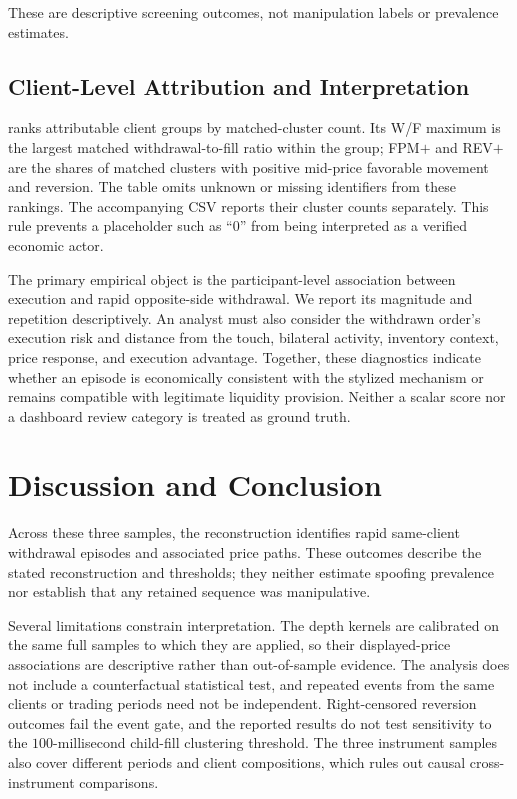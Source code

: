 \documentclass[11pt]{article}
\begin{document}
These are descriptive screening outcomes, not manipulation labels or prevalence estimates.

\subsection{Client-Level Attribution and Interpretation}
\label{subsec:client_level_results}

 ranks attributable client groups by matched-cluster count. Its W/F maximum is the
largest matched withdrawal-to-fill ratio within the group; FPM$+$ and REV$+$ are the shares of matched clusters with
positive mid-price favorable movement and reversion. The table omits unknown or missing identifiers from these rankings.
The accompanying CSV reports their cluster counts separately. This rule prevents a placeholder such as ``0'' from being
interpreted as a verified economic actor.

The primary empirical object is the participant-level association between execution and rapid opposite-side withdrawal.
We report its magnitude and repetition descriptively. An analyst must also consider the withdrawn order's execution risk
and distance from the touch, bilateral activity, inventory context, price response, and execution advantage. Together,
these diagnostics indicate whether an episode is economically consistent with the stylized mechanism or remains compatible
with legitimate liquidity provision. Neither a scalar score nor a dashboard review category is treated as ground truth.

\section{Discussion and Conclusion}
\label{sec:discussion_conclusion}

Across these three samples, the reconstruction identifies rapid same-client withdrawal episodes and associated price paths.
These outcomes describe the stated reconstruction and thresholds; they neither estimate spoofing prevalence nor establish
that any retained sequence was manipulative.

Several limitations constrain interpretation. The depth kernels are calibrated on the same full samples to which they are
applied, so their displayed-price associations are descriptive rather than out-of-sample evidence. The analysis does not
include a counterfactual statistical test, and repeated events from the same clients or trading periods need not be
independent. Right-censored reversion outcomes fail the event gate, and the reported results do not test sensitivity to the
$100$-millisecond child-fill clustering threshold. The three instrument samples also cover different periods and client
compositions, which rules out causal cross-instrument comparisons.
\end{document}
